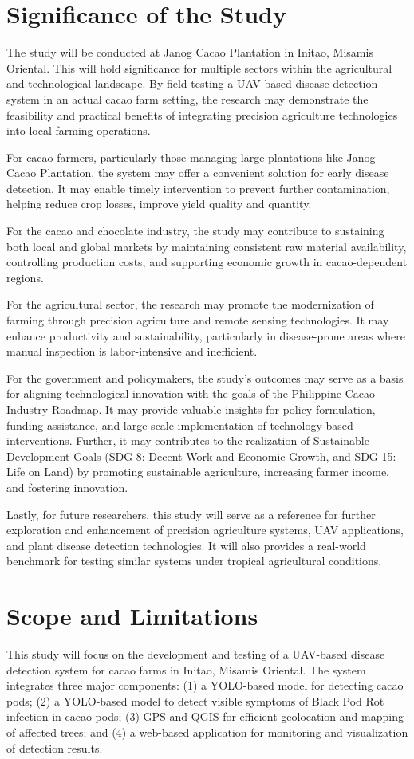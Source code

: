 {\section{Significance of the Study}
The study will be conducted at Janog Cacao Plantation in Initao, Misamis Oriental. This will hold significance for multiple sectors within the agricultural and technological landscape. By field-testing a UAV-based disease detection system in an actual cacao farm setting, the research may demonstrate the feasibility and practical benefits of integrating precision agriculture technologies into local farming operations.

For cacao farmers, particularly those managing large plantations like Janog Cacao Plantation, the system may offer a convenient solution for early disease detection. It may enable timely intervention to prevent further contamination, helping reduce crop losses, improve yield quality and quantity.

For the cacao and chocolate industry, the study may contribute to sustaining both local and global markets by maintaining consistent raw material availability, controlling production costs, and supporting economic growth in cacao-dependent regions.

For the agricultural sector, the research may promote the modernization of farming through precision agriculture and remote sensing technologies. It may enhance productivity and sustainability, particularly in disease-prone areas where manual inspection is labor-intensive and inefficient.

For the government and policymakers, the study’s outcomes may serve as a basis for aligning technological innovation with the goals of the Philippine Cacao Industry Roadmap. It may provide valuable insights for policy formulation, funding assistance, and large-scale implementation of technology-based interventions. Further, it may contributes to the realization of Sustainable Development Goals (SDG 8: Decent Work and Economic Growth, and SDG 15: Life on Land) by promoting sustainable agriculture, increasing farmer income, and fostering innovation.

Lastly, for future researchers, this study will serve as a reference for further exploration and enhancement of precision agriculture systems, UAV applications, and plant disease detection technologies. It will also provides a real-world benchmark for testing similar systems under tropical agricultural conditions.

\section{Scope and Limitations}
This study will focus on the development and testing of a UAV-based disease detection system for cacao farms in Initao, Misamis Oriental. The system integrates three major components: (1) a YOLO-based model for detecting cacao pods; (2) a YOLO-based model to detect visible symptoms of Black Pod Rot infection in cacao pods; (3) GPS and QGIS for efficient geolocation and mapping of affected trees; and (4) a web-based application for monitoring and visualization of detection results.

}
